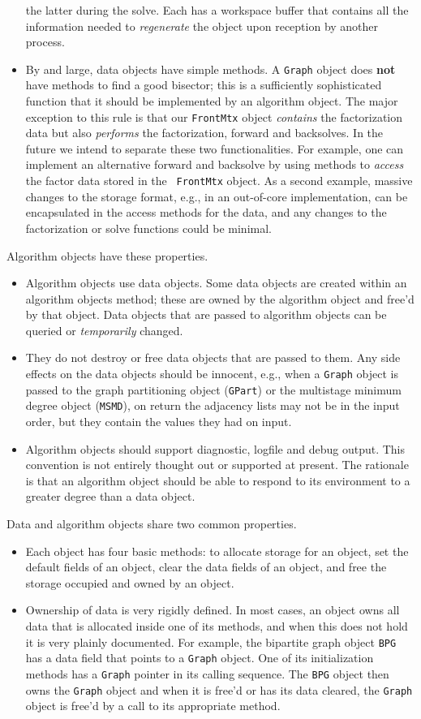 \begin{itemize}
the latter during the solve.
Each has a workspace buffer that contains all the information
needed to {\it regenerate} the object upon reception by another
process.
\item
By and large, data objects have simple methods.
A {\tt Graph} object does {\bf not} have methods to find a good
bisector; this is a sufficiently sophisticated function that it
should be implemented by an algorithm object.
The major exception to this rule is that our {\tt FrontMtx} object
{\it contains} the factorization data but also {\it performs} the
factorization, forward and backsolves.
In the future we intend to separate these two functionalities.
For example, one can implement an alternative forward and backsolve
by using methods to {\it access} the factor data stored in the {\tt
FrontMtx} object.
As a second example, massive changes to the storage format,
e.g., in an out-of-core implementation, can be encapsulated in the
access methods for the data, and any changes to the factorization
or solve functions could be minimal.
\end{itemize}
Algorithm objects have these properties.
\begin{itemize}
\item
Algorithm objects use data objects.
Some data objects are created within an algorithm objects method; 
these are owned by the algorithm object and free'd by that object.
Data objects that are passed to algorithm objects can be queried
or {\it temporarily} changed.
\item
They do not destroy or free data objects that are passed to them.
Any side effects on the data objects should be innocent, e.g.,
when a {\tt Graph} object is passed to the graph partitioning
object ({\tt GPart}) or the multistage minimum degree object
({\tt MSMD}), on return the adjacency lists may not be in the input
order, but they contain the values they had on input.
\item
Algorithm objects should support diagnostic, logfile and debug output.
This convention is not entirely thought out or supported at present. 
The rationale is that an algorithm object should be able to respond
to its environment to a greater degree than a data object.
\end{itemize}
\par
Data and algorithm objects share two common properties.
\begin{itemize}
\item
Each object has four basic methods: to allocate storage for an
object, set the default fields of an object, 
clear the data fields of an object,
and free the storage occupied and owned by an object.
\item
Ownership of data is very rigidly defined.
In most cases,
an object owns all data that is allocated inside one of its
methods, 
and when this does not hold it is very plainly documented.
For example, the bipartite graph object {\tt BPG} has a data field
that points to a {\tt Graph} object.
One of its initialization methods has a {\tt Graph} pointer in its
calling sequence.
The {\tt BPG} object then owns the {\tt Graph} object and when it
is free'd or has its data cleared, the {\tt Graph} object is free'd
by a call to its appropriate method.
\end{itemize}
